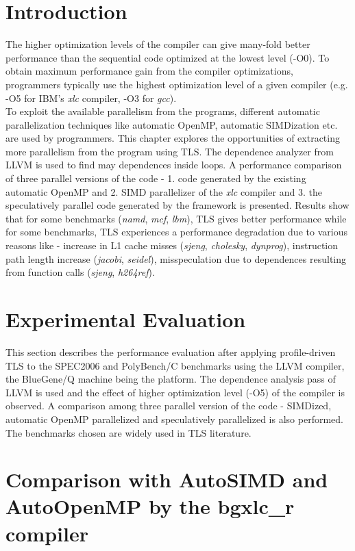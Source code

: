 \documentclass[10pt]{report}          %
\begin{document}
\section{Introduction}

The higher optimization levels of the compiler can give many-fold better performance than the sequential code optimized at the lowest level (-O0).  To obtain maximum performance gain from the compiler optimizations, programmers typically use the highest optimization level of a given compiler (e.g. -O5 for IBM's \textit{xlc} compiler, -O3 for \textit{gcc}).\\
To exploit the available parallelism from the programs, different automatic parallelization techniques like automatic OpenMP, automatic SIMDization etc. are used by programmers.  This chapter explores the opportunities of extracting more parallelism from the program using TLS.  The dependence analyzer from LLVM is used to find may dependences inside loops.  A performance comparison of three parallel versions of the code - 1. code generated by the existing automatic OpenMP and 2. SIMD parallelizer of the \textit{xlc} compiler and 3. the speculatively parallel code generated by the framework is presented.  Results show that for some benchmarks (\textit{namd}, \textit{mcf}, \textit{lbm}), TLS gives better performance while for some benchmarks, TLS experiences a performance degradation due to various reasons like - increase in L1 cache misses (\textit{sjeng}, \textit{cholesky}, \textit{dynprog}), instruction path length increase (\textit{jacobi}, \textit{seidel}), misspeculation due to dependences resulting from function calls (\textit{sjeng}, \textit{h264ref}).

\section{Experimental Evaluation}

This section describes the performance evaluation after applying profile-driven TLS to the SPEC2006 and PolyBench/C benchmarks using the LLVM compiler, the BlueGene/Q machine being the platform.  The dependence analysis pass of LLVM is used and the effect of higher optimization level (-O5) of the compiler is observed.  A comparison among three parallel version of the code - SIMDized, automatic OpenMP parallelized and speculatively parallelized is also performed. The benchmarks chosen are widely used in TLS literature.

\section{Comparison with AutoSIMD and AutoOpenMP by the bgxlc\_r compiler}
\end{document}
